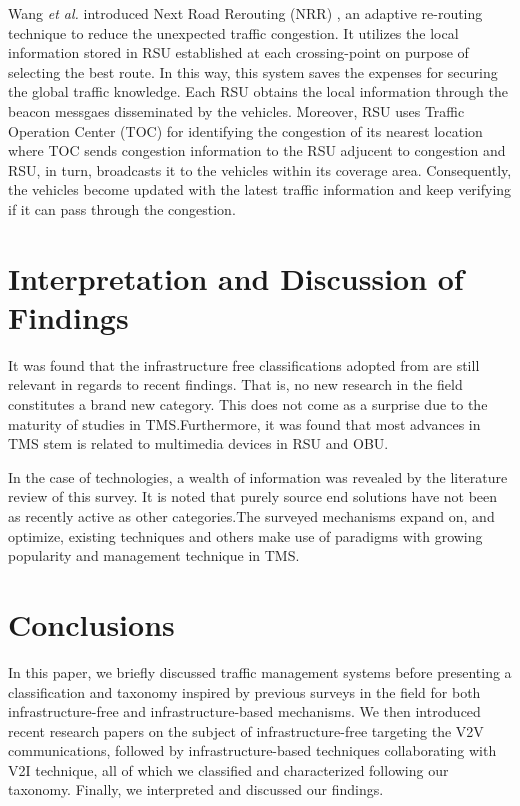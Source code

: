 \documentclass[conference]{IEEEtran}
\begin{document}
Wang \textit{et al.} introduced Next Road Rerouting (NRR) \cite{7385577}, an adaptive re-routing technique to reduce the unexpected traffic congestion. It utilizes the local information stored in RSU established at each crossing-point on purpose of selecting the best route. In this way, this system saves the expenses for securing the global traffic knowledge. Each RSU obtains the local information through the beacon messgaes disseminated by the vehicles. Moreover, RSU uses Traffic Operation Center (TOC)  for identifying the congestion of its nearest location where TOC sends congestion information to the RSU adjucent to congestion and RSU, in turn, broadcasts it to the vehicles within its coverage area. Consequently, the vehicles become  updated with the latest traffic information and keep verifying if it can pass through the congestion.






\section{Interpretation and Discussion of Findings}

It was found that the infrastructure free classifications adopted from \cite{souza:review} are still relevant in regards to recent findings. That is, no new research in the field constitutes a brand new category. This does not come as a surprise due to the maturity of studies in TMS.Furthermore, it was found that most advances in TMS stem\cite{Multimedia:chao}  is related to multimedia devices in RSU and OBU.

In the case of technologies, a wealth of information was revealed by the literature review of this survey. It is noted that purely source end solutions have not been as recently active as other categories.The surveyed mechanisms expand on, and optimize, existing techniques and others make use of paradigms with growing popularity and management technique in TMS.




\section{Conclusions}
In this paper, we briefly discussed traffic management systems  before presenting a classification and taxonomy inspired by previous surveys in the field for both infrastructure-free and infrastructure-based mechanisms. We then introduced recent research papers on the subject of infrastructure-free targeting the V2V communications, followed by infrastructure-based techniques collaborating with V2I technique, all of which we classified and characterized following our taxonomy. Finally, we interpreted and discussed our findings.
\end{document}
